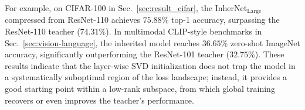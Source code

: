\documentclass{article} %
\begin{document}
For example, on CIFAR-100 in Sec.~\ref{sec:result_cifar}, the InherNet$_{\text{Large}}$ compressed from ResNet-110 achieves $75.88\%$ top-1 accuracy, surpassing the ResNet-110 teacher ($74.31\%$). In multimodal CLIP-style benchmarks in Sec.~\ref{sec:vision-language}, the inherited model reaches $36.65\%$ zero-shot ImageNet accuracy, significantly outperforming the ResNet-101 teacher ($32.75\%$). These results indicate that the layer-wise SVD initialization does not trap the model in a systematically suboptimal region of the loss landscape; instead, it provides a good starting point within a low-rank subspace, from which global training recovers or even improves the teacher's performance.






\end{document}
